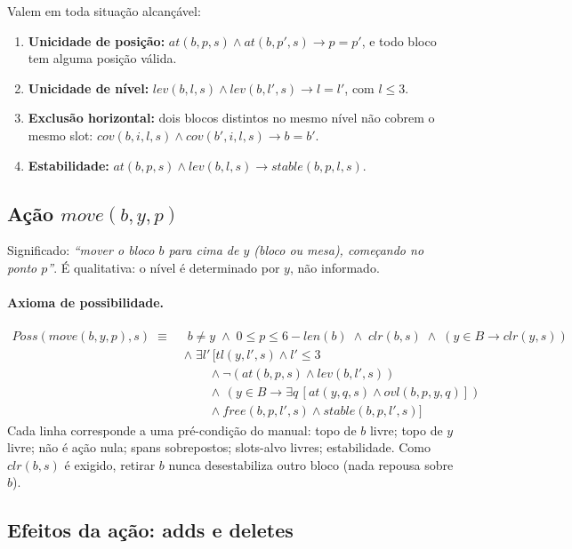 \documentclass[11pt,a4paper]{article}
\newcommand{\At}{\mathit{at}}
\newcommand{\Lev}{\mathit{lev}}
\newcommand{\Clr}{\mathit{clr}}
\newcommand{\Cov}{\mathit{cov}}
\newcommand{\Ovl}{\mathit{ovl}}
\newcommand{\Free}{\mathit{free}}
\newcommand{\Stable}{\mathit{stable}}
\newcommand{\Tl}{\mathit{tl}}
\newcommand{\Len}{\mathit{len}}
\newcommand{\Move}{\mathit{move}}
\newcommand{\Poss}{\mathit{Poss}}
\begin{document}
Valem em toda situação alcançável:
\begin{enumerate}
  \item \textbf{Unicidade de posição:} $\At(b,p,s)\wedge\At(b,p',s)\rightarrow p=p'$, e todo bloco tem alguma posição válida.
  \item \textbf{Unicidade de nível:} $\Lev(b,l,s)\wedge\Lev(b,l',s)\rightarrow l=l'$, com $l\le 3$.
  \item \textbf{Exclusão horizontal:} dois blocos distintos no mesmo nível não cobrem o mesmo slot:
  $\Cov(b,i,l,s)\wedge\Cov(b',i,l,s)\rightarrow b=b'$.
  \item \textbf{Estabilidade:} $\At(b,p,s)\wedge\Lev(b,l,s)\rightarrow\Stable(b,p,l,s)$.
\end{enumerate}

\subsection{Ação \texorpdfstring{$\Move(b,y,p)$}{move(b,y,p)}}

Significado: \emph{``mover o bloco $b$ para cima de $y$ (bloco ou mesa), começando no ponto $p$''}. É qualitativa: o nível é determinado por $y$, não informado.

\paragraph{Axioma de possibilidade.}
\begin{align*}
\Poss(\Move(b,y,p),s)\;\equiv\;&\; b\ne y\;\wedge\;0\le p\le 6-\Len(b)\;\wedge\;\Clr(b,s)\;\wedge\;(y\in B\rightarrow\Clr(y,s))\\
&\wedge\;\exists l'\,\big[\Tl(y,l',s)\wedge l'\le 3\\
&\qquad\wedge\neg(\At(b,p,s)\wedge\Lev(b,l',s))\\
&\qquad\wedge\,(y\in B\rightarrow\exists q\,[\At(y,q,s)\wedge\Ovl(b,p,y,q)])\\
&\qquad\wedge\Free(b,p,l',s)\wedge\Stable(b,p,l',s)\big]
\end{align*}
Cada linha corresponde a uma pré-condição do manual: topo de $b$ livre; topo de $y$ livre; não é ação nula; spans sobrepostos; slots-alvo livres; estabilidade.
Como $\Clr(b,s)$ é exigido, retirar $b$ nunca desestabiliza outro bloco (nada repousa sobre $b$).

\subsection{Efeitos da ação: adds e deletes}
\end{document}

